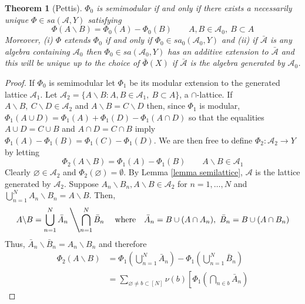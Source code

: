 \documentclass[11pt]{amsart}
\newtheorem{theorem}{Theorem}
\theoremstyle{plain}
\begin{document}
\begin{theorem}[Pettis]
\label{th pettis}
$\Phi_0$ is semimodular if and only if there exists a necessarily unique $\Phi\in sa({\mathscr{A}},Y)$ 
satisfying
\begin{equation}
\label{pettis}
\Phi(A\backslash B)=\Phi_0(A)-\Phi_0(B)\qquad A,B\in{\mathscr{A}}_0,\ B\subset A
\end{equation}
Moreover, (i) $\Phi$ extends $\Phi_0$ if and only if $\Phi_0\in sa_0({\mathscr{A}}_0,Y)$ and (ii)
if $\bar{\mathscr{A}}$ is any algebra containing ${\mathscr{A}}_0$ then $\Phi_0\in sa({\mathscr{A}}_0,Y)$ has an additive 
extension to $\bar{\mathscr{A}}$ and this will be unique up to the choice of $\bar\Phi(X)$ if $\bar{\mathscr{A}}$ 
is the algebra generated by ${\mathscr{A}}_0$.
\end{theorem}
\begin{proof}
If $\Phi_0$ is semimodular let $\Phi_1$ be its modular extension to the generated lattice 
${\mathscr{A}}_1$. Let ${\mathscr{A}}_2=\{A\backslash B:A,B\in{\mathscr{A}}_1,\ B\subset A\}$, a $\cap$-lattice. If 
$A\backslash B,\ C\backslash D\in{\mathscr{A}}_2$ and $A\backslash B=C\backslash D$ then, 
since $\Phi_1$ is modular, $\Phi_1(A\cup D)=\Phi_1(A)+\Phi_1(D)-\Phi_1(A\cap D)$ 
so that the equalities $A\cup D=C\cup B$ and $A\cap D=C\cap B$ imply 
$\Phi_1(A)-\Phi_1(B)=\Phi_1(C)-\Phi_1(D)$. We are then free to define 
$\Phi_2:{\mathscr{A}}_2\to Y$ by letting 
\begin{equation}
\Phi_2(A\backslash B)=\Phi_1(A)-\Phi_1(B)\qquad A\backslash B\in{\mathscr{A}}_1
\end{equation}
Clearly ${\varnothing}\in{\mathscr{A}}_2$ and $\Phi_2({\varnothing})={\emptyset}$. By Lemma \ref{lemma semilattice}, ${\mathscr{A}}$ 
is the lattice generated by ${\mathscr{A}}_2$. Suppose $A_n\backslash B_n,A\backslash B\in{\mathscr{A}}_2$ for 
$n=1,\ldots,N$ and $\bigcup_{n=1}^NA_n\backslash B_n=A\backslash B$. Then, 
\begin{equation*}
A\backslash B=\bigcup_{n=1}^N\bar A_n\left\backslash\bigcap_{n=1}^N\bar B_n\right.
\quad\text{where}\quad
\bar A_n=B\cup(A\cap A_n),\ \bar B_n=B\cup(A\cap B_n)
\end{equation*}
Thus, $\bar A_n\backslash\bar B_n=A_n\backslash B_n$ and therefore
\begin{align*}
\Phi_2(A\backslash B)
&=
\Phi_1\left(\bigcup_{n=1}^N\bar A_n\right)-\Phi_1\left(\bigcup_{n=1}^N\bar B_n\right)\\
&=
\sum_{{\varnothing}\ne b\subset[N]}\nu(b)\left[\Phi_1\left(\bigcap_{n\in b}\bar A_n\right)

\end{align*}
\end{proof}
\end{document}
